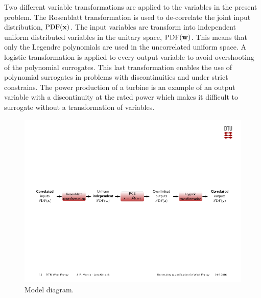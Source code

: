 \documentclass[preprint,12pt]{elsarticle}
\begin{document}
Two different variable transformations are applied to the variables in the present problem. The Rosenblatt transformation \cite{rosenblatt1952} is used to de-correlate the joint input distribution, $\mathrm{PDF}(\mathbf{x})$. The input variables are transform into independent uniform distributed variables in the unitary space, $\mathrm{PDF}(\mathbf{w})$. This means that only the Legendre polynomials are used in the uncorrelated uniform space. A logistic transformation \cite{simard1998transformation} is applied to every output variable to avoid overshooting of the polynomial surrogates. This last transformation enables the use of polynomial surrogates in problems with discontinuities and under strict constrains. The power production of a turbine is an example of an output variable with a discontinuity at the rated power which makes it difficult to surrogate without a transformation of variables.


\begin{figure}[h!]
\begin{centering}
\includegraphics[width=\columnwidth]{Figures/2_transfromation_steps.pdf}
\caption{Model diagram.}
\label{fig_HR_loc}
\end{centering}
\end{figure}



\end{document}
